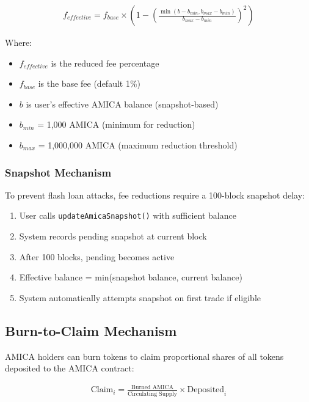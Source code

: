 \documentclass{article}
\begin{document}
\begin{align}
f_{effective} = f_{base} \times \left(1 - \left(\frac{\min(b - b_{min}, b_{max} - b_{min})}{b_{max} - b_{min}}\right)^2\right)
\end{align}

Where:
\begin{itemize}
    \item $f_{effective}$ is the reduced fee percentage
    \item $f_{base}$ is the base fee (default 1\%)
    \item $b$ is user's effective AMICA balance (snapshot-based)
    \item $b_{min}$ = 1,000 AMICA (minimum for reduction)
    \item $b_{max}$ = 1,000,000 AMICA (maximum reduction threshold)
\end{itemize}

\subsubsection{Snapshot Mechanism}

To prevent flash loan attacks, fee reductions require a 100-block snapshot delay:

\begin{enumerate}
    \item User calls \texttt{updateAmicaSnapshot()} with sufficient balance
    \item System records pending snapshot at current block
    \item After 100 blocks, pending becomes active
    \item Effective balance = min(snapshot balance, current balance)
    \item System automatically attempts snapshot on first trade if eligible
\end{enumerate}

\subsection{Burn-to-Claim Mechanism}

AMICA holders can burn tokens to claim proportional shares of all tokens deposited to the AMICA contract:

\begin{align}
\text{Claim}_i = \frac{\text{Burned AMICA}}{\text{Circulating Supply}} \times \text{Deposited}_i
\end{align}
\end{document}
